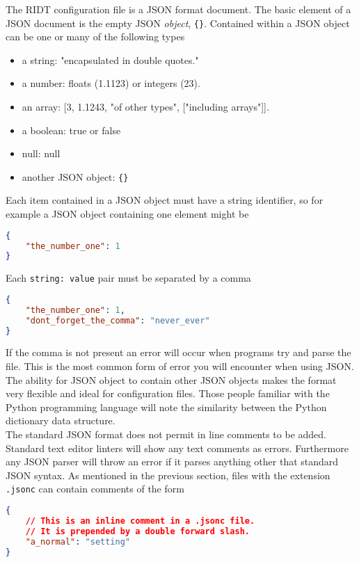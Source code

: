 \documentclass[]{article}
\def\code#1{\texttt{#1}}
\begin{document}
The RIDT configuration file is a JSON format document. The basic element of a
JSON document is the empty JSON \emph{object}, \code{\{\}}. Contained within
a JSON object can be one or many of the following types
\begin{itemize}
    \item a string: "encapsulated in double quotes."
    \item a number: floats (1.1123) or integers (23).
    \item an array: [3, 1.1243, "of other types", ["including arrays"]].
    \item a boolean: true or false
    \item null: null
    \item another JSON object: \code{\{\}}
\end{itemize}
Each item contained in a JSON object must have a string identifier, so for
example a JSON object containing one element might be\\
\begin{lstlisting}[language=json,firstnumber=1]
{
    "the_number_one": 1
}
\end{lstlisting}
\medskip
Each \code{string: value} pair must be separated by a comma\\
\begin{lstlisting}[language=json,firstnumber=1]
{
    "the_number_one": 1,
    "dont_forget_the_comma": "never_ever"
}
\end{lstlisting}
\medskip
If the comma is not present an error will occur when programs try and parse the
file. This is the most common form of error you will encounter when using
JSON.\\

\noindent The ability for JSON object to contain other JSON objects makes the
format very flexible and ideal for configuration files. Those people familiar
with the Python programming language will note the similarity between the Python
dictionary data structure.\\

\noindent The standard JSON format does not permit in line comments to be added.
Standard text editor linters will show any text comments as errors. Furthermore
any JSON parser will throw an error if it parses anything other that standard
JSON syntax. As mentioned in the previous section, files with the extension
\code{.jsonc} can contain comments of the form\\
\begin{lstlisting}[language=json, firstnumber=1]
{
    // This is an inline comment in a .jsonc file.
    // It is prepended by a double forward slash.
    "a_normal": "setting"
}
\end{lstlisting}
\medskip
\end{document}
